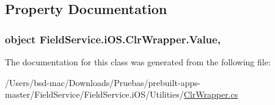 \subsection{Property Documentation}
\hypertarget{class_field_service_1_1i_o_s_1_1_clr_wrapper_a6d8cc0a0485cef1c54c6d1300980dcad}{
\subsubsection[{Value}]{\setlength{\rightskip}{0pt plus 5cm}object Field\+Service.\+i\+O\+S.\+Clr\+Wrapper.\+Value\hspace{0.3cm}{\ttfamily [get]}, {\ttfamily [set]}}}\label{class_field_service_1_1i_o_s_1_1_clr_wrapper_a6d8cc0a0485cef1c54c6d1300980dcad}


The documentation for this class was generated from the following file\+:\begin{DoxyCompactItemize}
\item 
/\+Users/bsd-\/mac/\+Downloads/\+Pruebas/prebuilt-\/apps-\/master/\+Field\+Service/\+Field\+Service.\+i\+O\+S/\+Utilities/\hyperlink{_clr_wrapper_8cs}{Clr\+Wrapper.\+cs}\end{DoxyCompactItemize}
